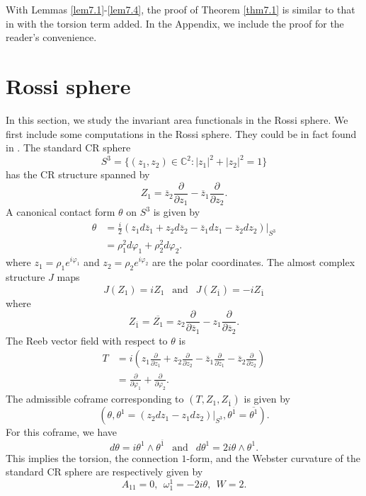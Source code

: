 \documentclass{amsart}
\theoremstyle{Corollary}
\numberwithin{equation}{section}
\begin{document}
With Lemmas \ref{lem7.1}-\ref{lem7.4},
the proof of Theorem \ref{thm7.1} is similar to that in \cite[Section 3.2, Theorem 8]{CYZ}
 with the torsion term added. In the Appendix, we
include the proof  for the reader's convenience.



\section{Rossi sphere}\label{section8}

In this section, we study the invariant area functionals 
in the Rossi sphere. 
We first include some computations in the Rossi sphere. 
They could be in fact found in \cite{CHP,CH,T}. 
The standard CR sphere
$$S^3=\big\{(z_1,z_2)\in\mathbb{C}^2: |z_1|^2+|z_2|^2=1\big\}$$
has the CR structure spanned by
\begin{equation}\label{10.1}
Z_1=\overline{z}_2\frac{\partial}{\partial z_1}-\overline{z}_1\frac{\partial}{\partial z_2}.
\end{equation}
A canonical contact form $\theta$ on $S^3$ is given by
\begin{equation}\label{10.2}
\begin{split}
\theta&=\frac{i}{2}(z_1d\overline{z}_1+z_2d\overline{z}_2-\overline{z}_1dz_1-\overline{z}_2dz_2)\Big|_{S^3}\\
&=\rho_1^2d\varphi_1+\rho_2^2d\varphi_2.
\end{split}
\end{equation}
where $z_1=\rho_1 e^{i\varphi_1}$ and $z_2=\rho_2 e^{i\varphi_2}$ are the polar coordinates. 
The almost complex structure $J$ maps 
$$J(Z_1)=iZ_1~~\mbox{ and }~~J(Z_{\overline{1}})=-iZ_{\overline{1}}$$
where 
$$Z_{\overline{1}}=\overline{Z_1}=z_2\frac{\partial}{\partial \overline{z}_1}-z_1\frac{\partial}{\partial \overline{z}_2}.$$
The Reeb vector field with respect to $\theta$ is
\begin{equation}\label{10.3}
\begin{split}
T&=i\left(z_1\frac{\partial}{\partial z_1}+z_2\frac{\partial}{\partial z_2}-\overline{z}_1\frac{\partial}{\partial\overline{z}_1}-\overline{z}_2\frac{\partial}{\partial\overline{z}_2}\right)\\
&=\frac{\partial}{\partial\varphi_1}+\frac{\partial}{\partial\varphi_2}.
\end{split}
\end{equation}
The admissible coframe corresponding to $(T,Z_1,Z_{\overline{1}})$ is given by
$$(\theta,\theta^1=(z_2dz_1-z_1dz_2)|_{S^3},\theta^{\overline{1}}=\overline{\theta^1}).$$
For this coframe, we have
$$d\theta=i\theta^1\wedge \theta^{\overline{1}}~~\mbox{ and }~~d\theta^1=2i\theta\wedge\theta^1.$$
This implies the torsion, the connection $1$-form, and the Webster curvature 
of the standard CR sphere are respectively given by 
$$A_{11}=0,~~\omega_1^1=-2i\theta,~~W=2.$$
\end{document}
